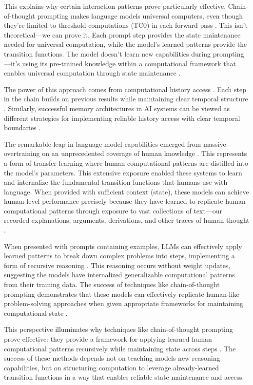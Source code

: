 \documentclass[12pt]{article}
\begin{document}
This explains why certain interaction patterns prove particularly effective.
Chain-of-thought prompting makes language models universal computers, even though they're limited to threshold computations (TC0) in each forward pass \cite{wei2022chain}.
This isn't theoretical---we can prove it.
Each prompt step provides the state maintenance needed for universal computation, while the model's learned patterns provide the transition functions.
The model doesn't learn new capabilities during prompting---it's using its pre-trained knowledge within a computational framework that enables universal computation through state maintenance \cite{ahn2024recursive}.

The power of this approach comes from computational history access \cite{fu2024memory}.
Each step in the chain builds on previous results while maintaining clear temporal structure \cite{wei2022chain}.
Similarly, successful memory architectures in AI systems can be viewed as different strategies for implementing reliable history access with clear temporal boundaries \cite{yang2013survey}.

The remarkable leap in language model capabilities emerged from massive overtraining on an unprecedented coverage of human knowledge \cite{schuurmans2024autoregressive}.
This represents a form of transfer learning where human computational patterns are distilled into the model's parameters.
This extensive exposure enabled these systems to learn and internalize the fundamental transition functions that humans use with language.
When provided with sufficient context (state), these models can achieve human-level performance precisely because they have learned to replicate human computational patterns through exposure to vast collections of text---our recorded explanations, arguments, derivations, and other traces of human thought \cite{brown2020language,wei2022chain}.

When presented with prompts containing examples, LLMs can effectively apply learned patterns to break down complex problems into steps, implementing a form of recursive reasoning \cite{wei2022chain}.
This reasoning occurs without weight updates, suggesting the models have internalized generalizable computational patterns from their training data.
The success of techniques like chain-of-thought prompting demonstrates that these models can effectively replicate human-like problem-solving approaches when given appropriate frameworks for maintaining computational state \cite{wei2022emergent}.

This perspective illuminates why techniques like chain-of-thought prompting prove effective: they provide a framework for applying learned human computational patterns recursively while maintaining state across steps \cite{wei2022chain}.
The success of these methods depends not on teaching models new reasoning capabilities, but on structuring computation to leverage already-learned transition functions in a way that enables reliable state maintenance and access.
\end{document}
